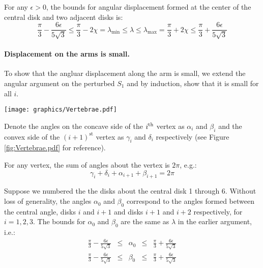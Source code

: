 For any $\epsilon > 0$, the bounds for angular displacement formed at the center of the central disk and two adjacent disks is:
$$ \frac{\pi}{3} - \frac{6 \epsilon}{5\sqrt{3}} \leq \frac{\pi}{3} - 2 \chi = \lambda_\text{min} \leq \lambda \leq \lambda_\text{max} = \frac{\pi}{3} + 2 \chi \leq \frac{\pi}{3} + \frac{6 \epsilon}{5\sqrt{3}}$$
\paragraph{Displacement on the arms is small.}
To show that the angluar displacement along the arm is small, we extend the angular argument on the perturbed $S_1$ and by induction, show that it is small for all $i$.  

\begin{minipage}{\linewidth}
\begin{center}
\texttt{[image: graphics/Vertebrae.pdf]}
\label{fig:Vertebrae.pdf}
\end{center}
\end{minipage}

Denote the angles on the concave side of the $i^\text{th}$ vertex as $\alpha_i$ and $\beta_i$ and the convex side of the $(i+1)^\text{st}$ vertex as $\gamma_i$ and $\delta_i$ respectively (see Figure \ref{fig:Vertebrae.pdf} for reference). 

For any vertex, the sum of angles about the vertex is $2 \pi$, e.g.:
$$\gamma_i + \delta_i + \alpha_{i+1} + \beta_{i+1} = 2 \pi$$ 

Suppose we numbered the the disks about the central disk 1 through 6.  
Without loss of generality, the angles $\alpha_0$ and $\beta_0$ correspond to the angles formed between the central angle, disks $i$ and $i+1$ and disks $i+1$ and $i+2$ respectively, for $i = 1,2,3$.  
The bounds for $\alpha_0$ and $\beta_0$ are the same as $\lambda$ in the earlier argument, i.e.:
$$
\begin{array}{rcccl}
\frac{\pi}{3} - \frac{6 \epsilon}{5\sqrt{3}} &\leq& \alpha_0 &\leq& \frac{\pi}{3} + \frac{6 \epsilon}{5\sqrt{3}}\\
\frac{\pi}{3} - \frac{6 \epsilon}{5\sqrt{3}} &\leq& \beta_0 &\leq& \frac{\pi}{3} + \frac{6 \epsilon}{5\sqrt{3}}\\
\end{array}
$$


